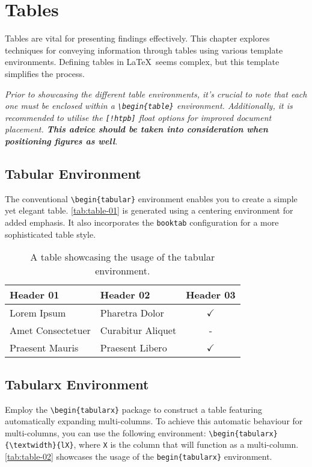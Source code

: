 {	\section{Tables}
	Tables are vital for presenting findings effectively. This chapter explores techniques for conveying information through tables using various template environments. Defining tables in \LaTeX\ seems complex, but this template simplifies the process.

	\begin{block}[tip]
		\textit{Prior to showcasing the different table environments, it's crucial to note that each one must be enclosed within a \texttt{\textbackslash begin\{table\}} environment. Additionally, it is recommended to utilise the \texttt{[!htpb]} float options for improved document placement. \textbf{This advice should be taken into consideration when positioning figures as well}.}
	\end{block}

	\subsection{Tabular Environment}
	The conventional \verb|\begin{tabular}| environment enables you to create a simple yet elegant table. \autoref{tab:table-01} is generated using a centering environment for added emphasis. It also incorporates the \verb|booktab| configuration for a more sophisticated table style.

	\begin{table}[!htpb]
		\caption{A table showcasing the usage of the tabular environment.}
		\label{tab:table-01}
		\centering
		\begin{tabular}{llc}
			\toprule
			\textbf{Header 01} & \textbf{Header 02} & \textbf{Header 03} \\
			\midrule
			Lorem Ipsum        & Pharetra Dolor     & $\checkmark$       \\
			Amet Consectetuer  & Curabitur Aliquet  & -                  \\
			Praesent Mauris    & Praesent Libero    & $\checkmark$       \\
			\bottomrule
		\end{tabular}
	\end{table}

	\subsection{Tabularx Environment}
	Employ the \verb|\begin{tabularx}| package to construct a table featuring automatically expanding multi-columns. To achieve this automatic behaviour for multi-columns, you can use the following environment: \verb|\begin{tabularx}{\textwidth}{lX}|, where \verb|X| is the column that will function as a multi-column. \autoref{tab:table-02} showcases the usage of the \verb|begin{tabularx}| environment.

}
